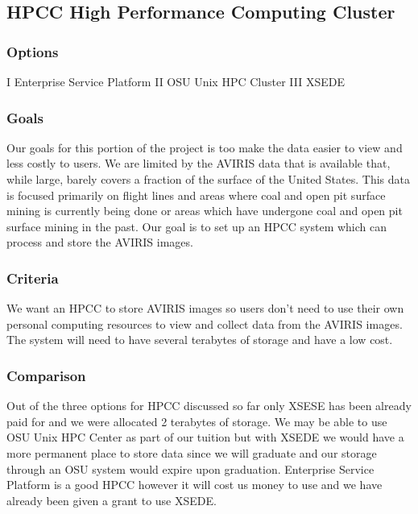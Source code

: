 \documentclass[10pt,draftclsnofoot,onecolumn,journal,compsoc]{IEEEtran}
\begin{document}
\subsection{HPCC High Performance Computing Cluster}

\subsubsection{Options}

\noindent I Enterprise Service Platform \newline
\noindent II OSU Unix HPC Cluster \newline
\noindent III XSEDE

\subsubsection{Goals}

\noindent Our goals for this portion of the project is too make the data easier to view and less costly to users. We are limited by the AVIRIS data that is available that, while large, barely covers a fraction of the surface of the United States. This data is focused primarily on flight lines and areas where coal and open pit surface mining is currently being done or areas which have undergone coal and open pit surface mining in the past. Our goal is to set up an HPCC system which can process and store the AVIRIS images.

\subsubsection{Criteria}

\noindent We want an HPCC to store AVIRIS images so users don’t need to use their own personal computing resources to view and collect data from the AVIRIS images. The system will need to have several terabytes of storage and have a low cost.

\subsubsection{Comparison}

\noindent Out of the three options for HPCC discussed so far only XSESE has been already paid for and we were allocated 2 terabytes of storage. We may be able to use OSU Unix HPC Center as part of our tuition but with XSEDE we would have a more permanent place to store data since we will graduate and our storage through an OSU system would expire upon graduation. Enterprise Service Platform is a good HPCC however it will cost us money to use and we have already been given a grant to use XSEDE.
\end{document}
